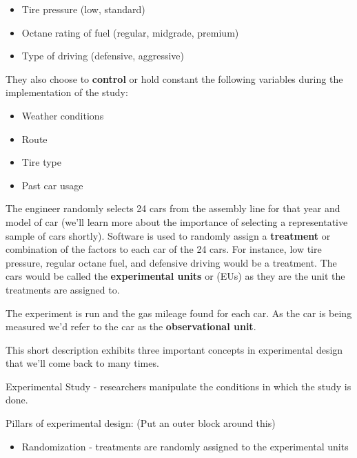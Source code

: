 \documentclass[
]{book}
\providecommand{\tightlist}{%
  \setlength{\itemsep}{0pt}\setlength{\parskip}{0pt}}
\theoremstyle{definition}
\theoremstyle{definition}
\theoremstyle{definition}
\theoremstyle{remark}
\let\BeginKnitrBlock\begin \let\EndKnitrBlock\end
\begin{document}
\begin{itemize}
\tightlist
\item
  Tire pressure (low, standard)\\
\item
  Octane rating of fuel (regular, midgrade, premium)\\
\item
  Type of driving (defensive, aggressive)
\end{itemize}

They also choose to \textbf{control} or hold constant the following variables during the implementation of the study:

\begin{itemize}
\tightlist
\item
  Weather conditions\\
\item
  Route\\
\item
  Tire type\\
\item
  Past car usage
\end{itemize}

The engineer randomly selects 24 cars from the assembly line for that year and model of car (we'll learn more about the importance of selecting a representative sample of cars shortly). Software is used to randomly assign a \textbf{treatment} or combination of the factors to each car of the 24 cars. For instance, low tire pressure, regular octane fuel, and defensive driving would be a treatment. The cars would be called the \textbf{experimental units} or (EUs) as they are the unit the treatments are assigned to.

The experiment is run and the gas mileage found for each car. As the car is being measured we'd refer to the car as the \textbf{observational unit}.

This short description exhibits three important concepts in experimental design that we'll come back to many times.

\BeginKnitrBlock{definition}
Experimental Study - researchers manipulate the conditions in which the study is done.
\EndKnitrBlock{definition}

Pillars of experimental design: (Put an outer block around this)

\BeginKnitrBlock{definition}
\begin{itemize}
\tightlist
\item
  Randomization - treatments are randomly assigned to the experimental units\\
\end{itemize}
\EndKnitrBlock{definition}
\end{document}
